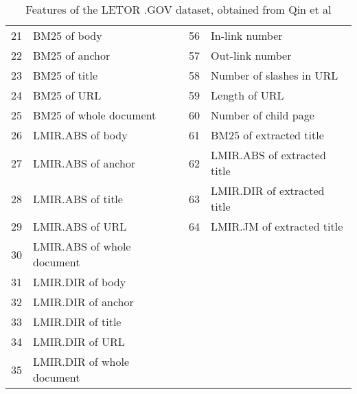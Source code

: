 \begin{table}[!h]
{\begin{tabular}{p{0.29cm}|p{7.26cm}||p{0.29cm}|p{9.55cm}}
21& BM25 of body					& 56& In-link number\\
22& BM25 of anchor					& 57& Out-link number\\
23& BM25 of title					& 58& Number of slashes in \ac{URL}\\
24& BM25 of \ac{URL}				& 59& Length of \ac{URL}\\
25& BM25 of whole document			& 60& Number of child page\\

26& LMIR.ABS\cite{Zhai2001} of body	& 61& BM25 of extracted title\\
27& LMIR.ABS of anchor				& 62& LMIR.ABS of extracted title\\
28& LMIR.ABS of title				& 63& LMIR.DIR of extracted title\\
29& LMIR.ABS of \ac{URL}			& 64& LMIR.JM of extracted title\\
30& LMIR.ABS of whole document\\

31& LMIR.DIR of body\\
32& LMIR.DIR of anchor\\
33& LMIR.DIR of title\\
34& LMIR.DIR of \ac{URL}\\
35& LMIR.DIR of whole document\\
\end{tabular}
}
\caption{Features of the LETOR .GOV dataset, obtained from Qin et al\cite{Qin2010}}
\label{tbl:features_gov}
\end{table}

